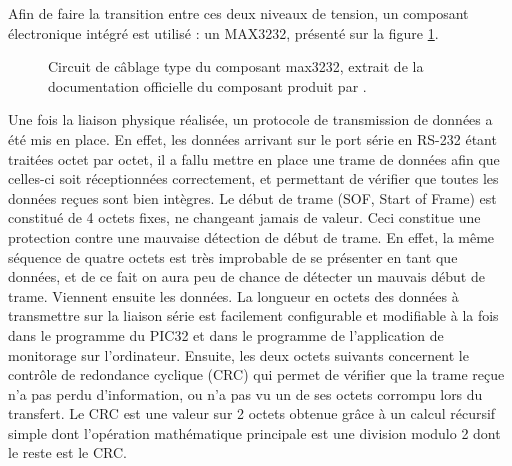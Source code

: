 \documentclass[letterpaper, twoside, 12pt, memoire, creativecommons, hyperref]{thETS}
\begin{document}
Afin de faire la transition entre ces deux niveaux de tension, un composant électronique intégré est utilisé : un MAX3232, présenté sur la figure \ref{fig:max3232}.

\begin{figure}
	\centering
	\caption{Circuit de câblage type du composant max3232, extrait de la documentation officielle du composant produit par \cite{MAXIM3232}.}
	\label{fig:max3232}
\end{figure}

Une fois la liaison physique réalisée, un protocole de transmission de données a été mis en place. En effet, les données arrivant sur le port série en RS-232 étant traitées octet par octet, il a fallu mettre en place une trame de données afin que celles-ci soit réceptionnées correctement, et permettant de vérifier que toutes les données reçues sont bien intègres.
Le début de trame (SOF, Start of Frame) est constitué de 4 octets fixes, ne changeant jamais de valeur. Ceci constitue une protection contre une mauvaise détection de début de trame. En effet, la même séquence de quatre octets est très improbable de se présenter en tant que données, et de ce fait on aura peu de chance de détecter un mauvais début de trame. Viennent ensuite les données. La longueur en octets des données à transmettre sur la liaison série est facilement configurable et modifiable à la fois dans le programme du PIC32 et dans le programme de l'application de monitorage sur l'ordinateur.
Ensuite, les deux octets suivants concernent le contrôle de redondance cyclique (CRC) qui permet de vérifier que la trame reçue n'a pas perdu d'information, ou n'a pas vu un de ses octets corrompu lors du transfert. Le CRC est une valeur sur 2 octets obtenue grâce à un calcul récursif simple dont l'opération mathématique principale est une division modulo 2 dont le reste est le CRC. %
\end{document}
